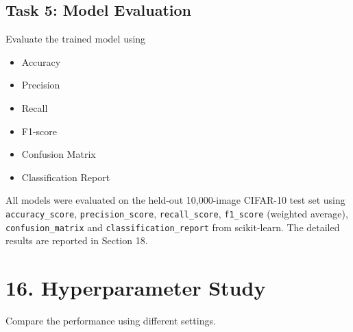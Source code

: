 \documentclass[11pt]{article}
\begin{document}

\subsection*{Task 5: Model Evaluation}

Evaluate the trained model using

\begin{itemize}

\item Accuracy

\item Precision

\item Recall

\item F1-score

\item Confusion Matrix

\item Classification Report

\end{itemize}

All models were evaluated on the held-out 10,000-image CIFAR-10 test set
using \texttt{accuracy\_score}, \texttt{precision\_score},
\texttt{recall\_score}, \texttt{f1\_score} (weighted average),
\texttt{confusion\_matrix} and \texttt{classification\_report} from
scikit-learn. The detailed results are reported in Section 18.


\section*{16. Hyperparameter Study}

Compare the performance using different settings.
\end{document}
